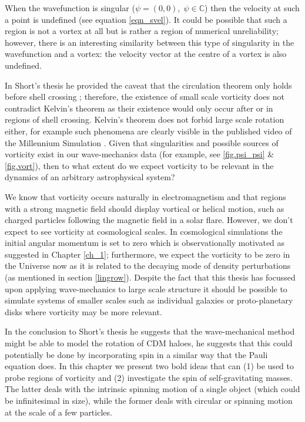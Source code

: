 When the wavefunction is singular ($\psi = (0,0), \;\psi\in\mathbb{C}$) then the velocity at such a point is undefined (see equation \ref{eqn_svel}). It could be possible that such a region is not a vortex at all but is rather a region of numerical unreliability; however, there is an interesting similarity between this type of singularity in the wavefunction and a vortex: the velocity vector at the centre of a vortex is also undefined.

In Short's thesis he provided the caveat that the circulation theorem only holds before shell crossing \citep{bib_short}; therefore, the existence of small scale vorticity does not contradict Kelvin's theorem as their existence would only occur after or in regions of shell crossing. Kelvin's theorem does not forbid large scale rotation either, for example such phenomena are clearly visible in the published video of the Millennium Simulation \citep{bib_mil}. Given that singularities and possible sources of vorticity exist in our wave-mechanics data (for example, see \ref{fig.psi_psi} \& \ref{fig.vort}), then to what extent do we expect vorticity to be relevant in the dynamics of an arbitrary astrophysical system?

We know that vorticity occurs naturally in electromagnetism and that regions with a strong magnetic field should display vortical or helical motion, such as charged particles following the magnetic field in a solar flare. However, we don't expect to see vorticity at cosmological scales. In cosmological simulations the initial angular momentum is set to zero which is observationally motivated as suggested in Chapter \ref{ch_1}; furthermore, we expect the vorticity to be zero in the Universe now as it is related to the decaying mode of density perturbations (as mentioned in section \ref{lingrow}). Despite the fact that this thesis has focussed upon applying wave-mechanics to large scale structure it should be possible to simulate systems of smaller scales such as individual galaxies or proto-planetary disks where vorticity may be more relevant.

In the conclusion to Short's thesis \citep{bib_short} he suggests that the wave-mechanical method might be able to model the rotation of CDM haloes, he suggests that this could potentially be done by incorporating spin in a similar way that the Pauli equation does. In this chapter we present two bold ideas that can (1) be used to probe regions of vorticity and (2) investigate the spin of self-gravitating masses. The latter deals with the intrinsic spinning motion of a single object (which could be infinitesimal in size), while the former deals with circular or spinning motion at the scale of a few particles.

